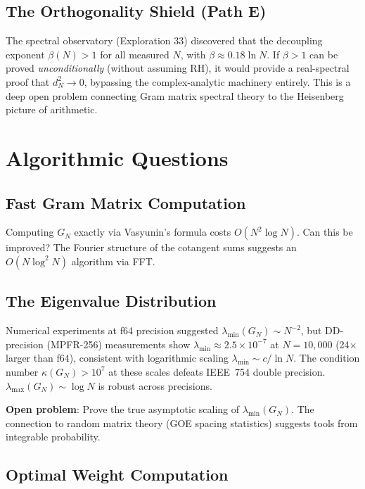 \documentclass[11pt,a4paper]{article}
\begin{document}
\subsection{The Orthogonality Shield (Path E)}

The spectral observatory (Exploration 33) discovered that the
decoupling exponent $\beta(N) > 1$ for all measured $N$, with
$\beta \approx 0.18 \ln N$. If $\beta > 1$ can be proved
\emph{unconditionally} (without assuming RH), it would provide
a real-spectral proof that $d_N^2 \to 0$, bypassing the
complex-analytic machinery entirely. This is a deep open problem
connecting Gram matrix spectral theory to the Heisenberg picture
of arithmetic.

\section{Algorithmic Questions}

\subsection{Fast Gram Matrix Computation}

Computing $G_N$ exactly via Vasyunin's formula costs $O(N^2 \log N)$.
Can this be improved? The Fourier structure of the cotangent sums
suggests an $O(N \log^2 N)$ algorithm via FFT.

\subsection{The Eigenvalue Distribution}

Numerical experiments at f64 precision suggested
$\lambda_{\min}(G_N) \sim N^{-2}$, but DD-precision (MPFR-256)
measurements show $\lambda_{\min} \approx 2.5 \times 10^{-7}$ at
$N = 10{,}000$ (24$\times$ larger than f64), consistent with
logarithmic scaling $\lambda_{\min} \sim c/\ln N$. The condition
number $\kappa(G_N) > 10^7$ at these scales defeats IEEE~754
double precision.
$\lambda_{\max}(G_N) \sim \log N$ is robust across precisions.

\textbf{Open problem}: Prove the true asymptotic scaling of
$\lambda_{\min}(G_N)$. The connection to random matrix theory
(GOE spacing statistics) suggests tools from integrable probability.

\subsection{Optimal Weight Computation}
\end{document}
